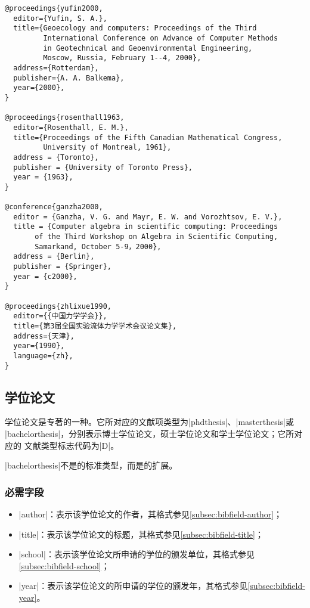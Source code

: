 \begin{verbatim}
@proceedings{yufin2000,
  editor={Yufin, S. A.},
  title={Geoecology and computers: Proceedings of the Third 
         International Conference on Advance of Computer Methods 
         in Geotechnical and Geoenvironmental Engineering, 
         Moscow, Russia, February 1--4, 2000},
  address={Rotterdam},
  publisher={A. A. Balkema},
  year={2000},
}

@proceedings{rosenthall1963,
  editor={Rosenthall, E. M.},
  title={Proceedings of the Fifth Canadian Mathematical Congress,
         University of Montreal, 1961},
  address = {Toronto},
  publisher = {University of Toronto Press},
  year = {1963},
}

@conference{ganzha2000,
  editor = {Ganzha, V. G. and Mayr, E. W. and Vorozhtsov, E. V.},
  title = {Computer algebra in scientific computing: Proceedings
       of the Third Workshop on Algebra in Scientific Computing, 
       Samarkand, October 5-9，2000},
  address = {Berlin},
  publisher = {Springer},
  year = {c2000},
}

@proceedings{zhlixue1990,
  editor={{中国力学学会}},
  title={第3届全国实验流体力学学术会议论文集},
  address={天津},
  year={1990},
  language={zh},
}
\end{verbatim}


\subsection{学位论文}\label{subsec:bibtype-thesis}

学位论文是专著的一种。它所对应的{\BibTeX}文献项类型为|phdthesis|、|masterthesis|或
|bachelorthesis|，分别表示博士学位论文，硕士学位论文和学士学位论文；它所对应的
文献类型标志代码为|D|\cite{gbt3469-1983}。

|bachelorthesis|不是{\BibTeX}的标准类型，而是{\njuthesis}的扩展。

\subsubsection{必需字段}

\begin{itemize}
\item |author|：表示该学位论文的作者，其格式参见\ref{subsec:bibfield-author}；
\item |title|：表示该学位论文的标题，其格式参见\ref{subsec:bibfield-title}；
\item |school|：表示该学位论文所申请的学位的颁发单位，其格式参见\ref{subsec:bibfield-school}；
\item |year|：表示该学位论文的所申请的学位的颁发年，其格式参见\ref{subsec:bibfield-year}。
\end{itemize}

